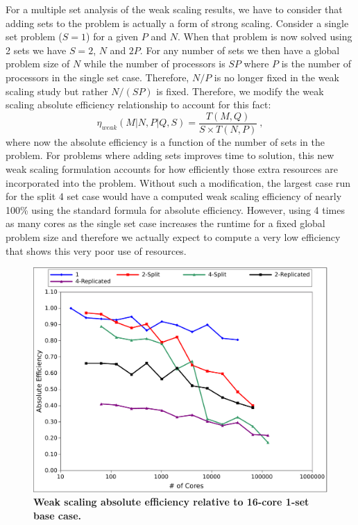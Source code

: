 For a multiple set analysis of the weak scaling results, we have to
consider that adding sets to the problem is actually a form of strong
scaling. Consider a single set problem ($S=1$) for a given $P$ and
$N$. When that problem is now solved using 2 sets we have $S=2$, $N$
and $2P$. For any number of sets we then have a global problem size of
$N$ while the number of processors is $SP$ where $P$ is the number of
processors in the single set case. Therefore, $N/P$ is no longer fixed
in the weak scaling study but rather $N/(SP)$ is fixed. Therefore, we
modify the weak scaling absolute efficiency relationship to account
for this fact:
\begin{equation}
\eta_{weak}(M|N,P|Q,S) = \frac{T(M,Q)}{S \times T(N,P)}\:,
  \label{eq:ms_weak_efficiency}
\end{equation}
where now the absolute efficiency is a function of the number of sets
in the problem. For problems where adding sets improves time to
solution, this new weak scaling formulation accounts for how
efficiently those extra resources are incorporated into the
problem. Without such a modification, the largest case run for the
split 4 set case would have a computed weak scaling efficiency of
nearly 100\% using the standard formula for absolute
efficiency. However, using 4 times as many cores as the single set
case increases the runtime for a fixed global problem size and
therefore we actually expect to compute a very low efficiency that
shows this very poor use of resources.

\begin{figure}[htpb!]
  \begin{center}
    \includegraphics[width=6in]{chapters/parallel_mc/titan_weak_ms_eff.pdf}
  \end{center}
  \caption{\textbf{Weak scaling absolute efficiency relative to
      16-core 1-set base case.}}
  \label{fig:titan_weak_ms_eff}
\end{figure}


